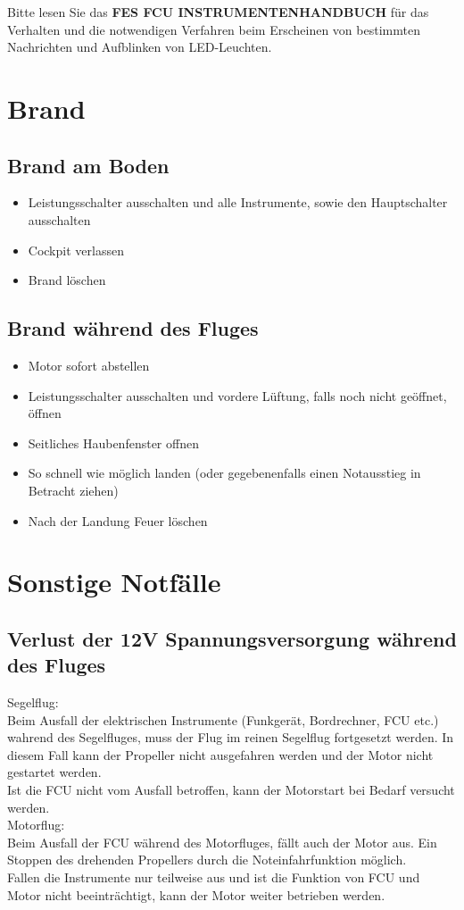 Bitte lesen Sie das \textbf{FES FCU INSTRUMENTENHANDBUCH} für das Verhalten und die notwendigen Verfahren beim Erscheinen von bestimmten Nachrichten und Aufblinken von LED-Leuchten.

\section{Brand}
\subsection{Brand am Boden}

\begin{itemize}
\item Leistungsschalter ausschalten und alle Instrumente, sowie den Hauptschalter ausschalten
\item Cockpit verlassen
\item Brand löschen
\end{itemize}
\newpage
\subsection{Brand während des Fluges}
\begin{itemize}
\item Motor sofort abstellen
\item Leistungsschalter ausschalten und vordere Lüftung, falls noch nicht geöffnet, öffnen
\item Seitliches Haubenfenster offnen
\item So schnell wie möglich landen (oder gegebenenfalls einen Notausstieg in Betracht ziehen)
\item Nach der Landung Feuer löschen
\end{itemize}

\section{Sonstige Notfälle}

\subsection{Verlust der 12V Spannungsversorgung während des Fluges}

Segelflug:\\
Beim Ausfall der elektrischen Instrumente (Funkgerät, Bordrechner, FCU etc.)
wahrend des Segelfluges, muss der Flug im reinen Segelflug fortgesetzt werden. In
diesem Fall kann der Propeller nicht ausgefahren werden und der Motor nicht gestartet werden.\\

Ist die FCU nicht vom Ausfall betroffen, kann der Motorstart bei Bedarf versucht werden.\\

Motorflug:\\
Beim Ausfall der FCU während des Motorfluges, fällt auch der Motor aus. Ein Stoppen des drehenden Propellers durch die Noteinfahrfunktion möglich.\\

Fallen die Instrumente nur teilweise aus und ist die Funktion von FCU und Motor nicht beeinträchtigt, kann der Motor weiter betrieben werden.

